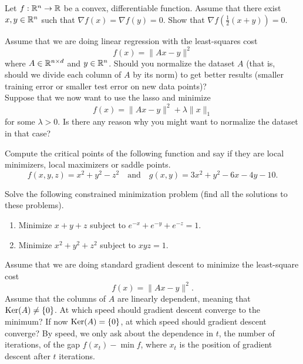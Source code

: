 \documentclass[11pt,nocut]{article}
\begin{document}
\begin{problem}
	Let $f: \mathbb{R}^n \to \mathbb{R}$ be a convex, differentiable function. Assume that there exist $x,y \in \mathbb{R}^n$ such that $\nabla f(x) = \nabla f(y) = 0$. Show that $\nabla f(\frac{1}{2}(x+y)) = 0$.
\end{problem}


\begin{problem}
	Assume that we are doing linear regression with the least-squares cost
	$$
	f(x) = \|Ax - y\|^2
	$$
	where $A \in \mathbb{R}^{n \times d}$ and $y \in \mathbb{R}^n$. Should you normalize the dataset $A$ (that is, should we divide each column of $A$ by its norm) to get better results (smaller training error or smaller test error on new data points)?
	\\

	Suppose that we now want to use the lasso and minimize
	$$
	f(x) = \|Ax - y\|^2 + \lambda \|x\|_1
	$$
	for some $\lambda > 0$. Is there any reason why you might want to normalize the dataset in that case?
\end{problem}


\begin{problem}
	Compute the critical points of the following function and say if they are local minimizers, local maximizers or saddle points.
	$$
	f(x,y,z) = x^2 + y^2 - z^2
	\quad \text{and} \quad g(x,y) = 3x^2 + y^2 - 6x -4y - 10.
	$$
\end{problem}
\begin{problem}
	Solve the following constrained minimization problem (find all the solutions to these problems).
	\begin{enumerate}
		\item Minimize $x + y + z$ subject to $e^{-x} + e^{-y} + e^{-z} = 1$.
		\item Minimize $x^2 + y^2 + z^2$ subject to $xyz=1$.
	\end{enumerate}
\end{problem}

\begin{problem}
	Assume that we are doing standard gradient descent to minimize the least-square cost
	$$
	f(x) = \|Ax-y\|^2.
	$$
	Assume that the columns of  $A$ are linearly dependent, meaning that ${{\rm Ker}}(A) \neq \{0\}$. At which speed should gradient descent converge to the minimum?
	If now ${{\rm Ker}}(A) = \{0\}$, at which speed should gradient descent converge?
	By speed, we only ask about the dependence in $t$, the number of iterations, of the gap 
	$f(x_t) - \min f$, where $x_t$ is the position of gradient descent after $t$ iterations.
\end{problem}
\end{document}
